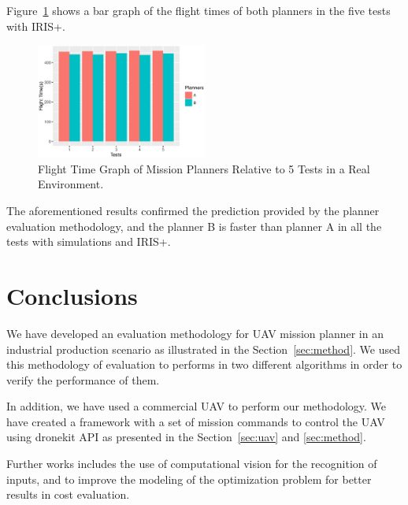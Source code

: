 \documentclass[conference,harvard,brazil,english]{sbatex}
\begin{document}
Figure~\ref{fig:GraPlannersReal} shows a bar graph of the flight times of both planners in the five tests with IRIS+.

\begin{figure}[H]
	\centering
	\includegraphics[width=0.5\textwidth]{GraPlannersReal.eps}
	\caption{Flight Time Graph of Mission Planners Relative to 5 Tests in a Real Environment.\label{fig:GraPlannersReal}}
	\end{figure}
	
	The aforementioned results confirmed the prediction provided by the planner evaluation methodology, and the planner B is faster than planner A in all the tests with simulations and IRIS+.

\section{Conclusions}
\label{sec:conclusao}

We have developed an evaluation methodology for UAV mission planner in an industrial production scenario as illustrated in the Section~\ref{sec:method}. We used this methodology of evaluation to performs in two different algorithms in order to verify the performance of them.

In addition, we have used a commercial UAV to perform our methodology. We have created a framework with a set of mission commands to control the UAV using dronekit API as presented in the Section~\ref{sec:uav} and \ref{sec:method}. 

Further works includes the use of computational vision for the recognition of inputs, and to improve the modeling of the optimization problem for better results in cost evaluation.
\end{document}
